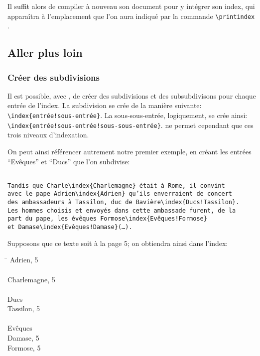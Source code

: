 Il suffit alors de compiler à nouveau son document pour y intégrer son index, qui apparaîtra à l'emplacement que l'on aura indiqué par la commande  \verb|\printindex |.



\subsection{Aller plus loin}
\subsubsection{Créer des subdivisions}

Il est possible, avec ,  de créer des subdivisions et des subsubdivisons  pour chaque entrée de l'index. La subdivision se crée de la manière suivante: \verb+\index{entrée!sous-entrée}+. La sous-sous-entrée, logiquement, se crée ainsi: \verb+\index{entrée!sous-entrée!sous-sous-entrée}+.  ne permet cependant que ces trois niveaux d'indexation.

On peut ainsi référencer autrement notre premier exemple, en créant les entrées \enquote{Evêques} et \enquote{Ducs} que l'on subdivise:

\begin{verbatim}

Tandis que Charle\index{Charlemagne} était à Rome, il convint 
avec le pape Adrien\index{Adrien} qu’ils enverraient de concert 
des ambassadeurs à Tassilon, duc de Bavière\index{Ducs!Tassilon}.
Les hommes choisis et envoyés dans cette ambassade furent, de la 
part du pape, les évêques Formose\index{Evêques!Formose}
et Damase\index{Evêques!Damase}(…).

\end{verbatim}

Supposons que ce texte soit à la page 5; on obtiendra ainsi dans l'index:
\begin{tabbing}
\hspace{0,5cm}  \= \kill
Adrien, 5 \\
\\
Charlemagne, 5 \\
\\
Ducs \\
\> Tassilon, 5\\
\\
Evêques \\
\> Damase, 5\\
\> Formose, 5\\

\end{tabbing}




